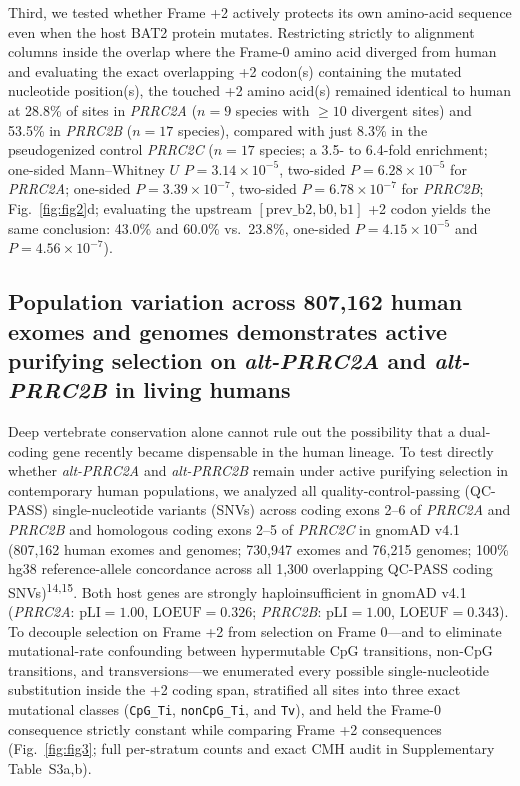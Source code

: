 \documentclass[10pt,letterpaper]{article}
\newcommand{\gene}[1]{\textit{#1}}
\newcommand{\refsup}[1]{\textsuperscript{#1}}
\begin{document}
Third, we tested whether Frame +2 actively protects its own amino-acid sequence even when the host BAT2 protein mutates. Restricting strictly to alignment columns inside the overlap where the Frame-0 amino acid diverged from human and evaluating the exact overlapping +2 codon(s) containing the mutated nucleotide position(s), the touched +2 amino acid(s) remained identical to human at 28.8\% of sites in \gene{PRRC2A} ($n = 9$ species with $\ge 10$ divergent sites) and 53.5\% in \gene{PRRC2B} ($n = 17$ species), compared with just 8.3\% in the pseudogenized control \gene{PRRC2C} ($n = 17$ species; a 3.5- to 6.4-fold enrichment; one-sided Mann--Whitney $U$ $P = 3.14 \times 10^{-5}$, two-sided $P = 6.28 \times 10^{-5}$ for \gene{PRRC2A}; one-sided $P = 3.39 \times 10^{-7}$, two-sided $P = 6.78 \times 10^{-7}$ for \gene{PRRC2B}; Fig.~\ref{fig:fig2}d; evaluating the upstream $[\text{prev\_b2}, \text{b0}, \text{b1}]$ +2 codon yields the same conclusion: 43.0\% and 60.0\% vs.\ 23.8\%, one-sided $P = 4.15 \times 10^{-5}$ and $P = 4.56 \times 10^{-7}$).

\subsection{Population variation across 807,162 human exomes and genomes demonstrates active purifying selection on \gene{alt-PRRC2A} and \gene{alt-PRRC2B} in living humans}

Deep vertebrate conservation alone cannot rule out the possibility that a dual-coding gene recently became dispensable in the human lineage. To test directly whether \gene{alt-PRRC2A} and \gene{alt-PRRC2B} remain under active purifying selection in contemporary human populations, we analyzed all quality-control-passing (QC-PASS) single-nucleotide variants (SNVs) across coding exons 2--6 of \gene{PRRC2A} and \gene{PRRC2B} and homologous coding exons 2--5 of \gene{PRRC2C} in gnomAD v4.1 (807,162 human exomes and genomes; 730,947 exomes and 76,215 genomes; 100\% hg38 reference-allele concordance across all 1,300 overlapping QC-PASS coding SNVs)\refsup{14,15}. Both host genes are strongly haploinsufficient in gnomAD v4.1 (\gene{PRRC2A}: $\text{pLI} = 1.00$, $\text{LOEUF} = 0.326$; \gene{PRRC2B}: $\text{pLI} = 1.00$, $\text{LOEUF} = 0.343$). To decouple selection on Frame +2 from selection on Frame 0---and to eliminate mutational-rate confounding between hypermutable CpG transitions, non-CpG transitions, and transversions---we enumerated every possible single-nucleotide substitution inside the +2 coding span, stratified all sites into three exact mutational classes (\texttt{CpG\_Ti}, \texttt{nonCpG\_Ti}, and \texttt{Tv}), and held the Frame-0 consequence strictly constant while comparing Frame +2 consequences (Fig.~\ref{fig:fig3}; full per-stratum counts and exact CMH audit in Supplementary Table~S3a,b).
\end{document}
